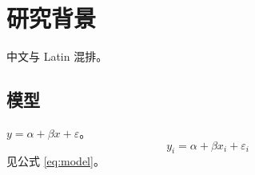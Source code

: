 \documentclass[UTF8,fontset=fandol,zihao=-4]{ctexart}
\begin{document}
\section{研究背景}中文与 Latin 混排。
\subsection{模型}$y=\alpha+\beta x+\varepsilon$。
\begin{equation}\label{eq:model}y_i=\alpha+\beta x_i+\varepsilon_i\end{equation}
见公式 \eqref{eq:model}。
\end{document}
